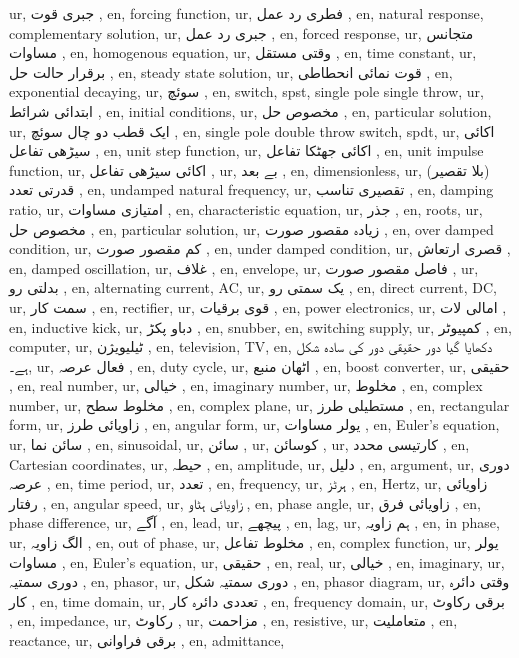 ur, جبری قوت ,
en, forcing function,
ur, فطری رد عمل ,
en, natural response, complementary solution,
ur, جبری رد عمل ,
en, forced response,
ur, متجانس مساوات ,
en, homogenous equation,
ur, وقتی مستقل ,
en, time constant,
ur, برقرار حالت حل ,
en, steady state solution,
ur, قوت نمائی انحطاطی ,
en, exponential decaying,
ur, سوئچ ,
en, switch, spst, single pole single throw,
ur, ابتدائی شرائط ,
en, initial conditions,
ur, مخصوص حل ,
en, particular solution,
ur, ایک قطب دو چال سوئچ ,
en, single pole double throw switch, spdt,
ur, اکائی سیڑھی تفاعل ,
en, unit step function,
ur, اکائی جھٹکا تفاعل ,
en, unit impulse function,
ur, اکائی سیڑھی تفاعل ,
ur, بے بعد ,
en, dimensionless,
ur, (بلا تقصیر) قدرتی تعدد ,
en, undamped natural frequency,
ur, تقصیری تناسب ,
en, damping ratio,
ur, امتیازی مساوات ,
en, characteristic equation,
ur, جذر ,
en, roots,
ur, مخصوص حل ,
en, particular solution,
ur, زیادہ مقصور صورت ,
en, over damped condition,
ur, کم مقصور صورت ,
en, under damped condition,
ur, قصری ارتعاش ,
en, damped oscillation,
ur, غلاف ,
en, envelope,
ur, فاصل مقصور صورت ,
ur, بدلتی رو ,
en, alternating current, AC,
ur, یک سمتی رو ,
en, direct current, DC,
ur, سمت کار ,
en, rectifier,
ur, قوی برقیات ,
en, power electronics,
ur, امالی لات ,
en, inductive kick,
ur, دباو پکڑ ,
en, snubber,
en, switching supply,
ur, کمپیوٹر ,
en, computer,
ur, ٹیلیویژن ,
en, television, TV,
en, دکھایا گیا دور حقیقی دور کی سادہ شکل ہے۔,
ur, فعال عرصہ ,
en, duty cycle,
ur, اٹھان منبع ,
en, boost converter,
ur, حقیقی ,
en, real number,
ur, خیالی ,
en, imaginary number,
ur, مخلوط ,
en, complex number,
ur, مخلوط سطح ,
en, complex plane,
ur, مستطیلی طرز ,
en, rectangular form,
ur, زاویائی طرز ,
en, angular form,
ur, یولر مساوات ,
en, Euler's equation,
ur, سائن نما ,
en, sinusoidal,
ur, سائن ,
ur, کوسائن ,
ur, کارتیسی محدد ,
en, Cartesian coordinates,
ur, حیطہ ,
en, amplitude,
ur, دلیل ,
en, argument,
ur, دوری عرصہ ,
en, time period,
ur, تعدد ,
en, frequency,
ur, ہرٹز ,
en, Hertz,
ur, زاویائی رفتار ,
en, angular speed,
ur, زاویائی ہٹاو ,
en, phase angle,
ur, زاویائی فرق ,
en, phase difference,
ur, آگے ,
en, lead,
ur, پیچھے ,
en, lag,
ur, ہم زاویہ ,
en, in phase,
ur, الگ زاویہ ,
en, out of phase,
ur, مخلوط تفاعل ,
en, complex function,
ur, یولر مساوات ,
en, Euler's equation,
ur, حقیقی ,
en, real,
ur, خیالی ,
en, imaginary,
ur, دوری سمتیہ ,
en, phasor,
ur, دوری سمتیہ شکل ,
en, phasor diagram,
ur, وقتی دائرہ کار ,
en, time domain,
ur, تعددی دائرہ کار ,
en, frequency domain,
ur, برقی رکاوٹ ,
en, impedance,
ur, رکاوٹ ,
ur, مزاحمت ,
en, resistive,
ur, متعاملیت ,
en, reactance,
ur, برقی فراوانی ,
en, admittance,
